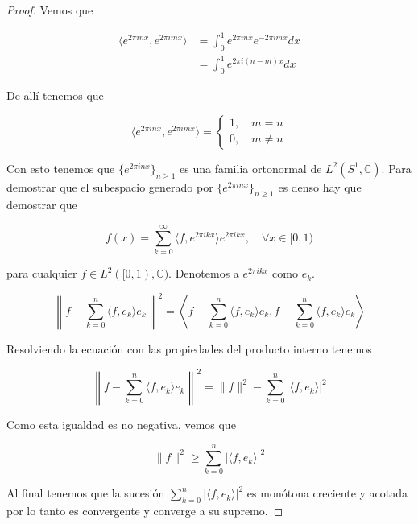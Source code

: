 \begin{proof}
	Vemos que
	
	\begin{align}
		\langle e^{2\pi inx},e^{2\pi imx} \rangle &= \int_{0}^{1} e^{2\pi inx} e^{-2\pi imx} dx\\
		&= \int_{0}^{1} e^{2\pi i(n-m)x} dx
	\end{align}
	
	De allí tenemos que
	
	\begin{equation}
		\langle e^{2\pi inx},e^{2\pi imx} \rangle = \begin{cases}
			1, \quad m=n\\			
			0,\quad m \neq n
		\end{cases}
	\end{equation}
	
	Con esto tenemos que $\{e^{2\pi inx}\}_{n \geq 1}$ es una familia ortonormal de $L^2(S^1,\mathbb{C})$. Para demostrar que el subespacio generado por $\{e^{2\pi inx}\}_{n \geq 1}$ es denso hay que demostrar que
	
	\begin{equation}
		f(x) = \sum_{k=0}^{\infty} \langle f,e^{2\pi ikx} \rangle e^{2\pi ikx}, \quad \forall x \in [0,1)
	\end{equation}
	
	para cualquier $f \in L^2([0,1),\mathbb{C})$. Denotemos a $e^{2\pi ikx}$ como $e_k$.
	
	\begin{equation}
		\left\| f - \sum_{k=0}^{n} \langle f,e_k \rangle e_k \right\|^2 = \left\langle f - \sum_{k=0}^{n} \langle f,e_k \rangle e_k, f - \sum_{k=0}^{n} \langle f,e_k \rangle e_k \right\rangle
	\end{equation}
	
	Resolviendo la ecuación con las propiedades del producto interno tenemos
	
	\begin{equation}
		\left\| f - \sum_{k=0}^{n} \langle f,e_k \rangle e_k \right\|^2 = \|f\|^2 - \sum_{k=0}^{n} |\langle f,e_k \rangle|^2
	\end{equation}
	
	Como esta igualdad es no negativa, vemos que
	
	\begin{equation}
		\|f\|^2 \geq \sum_{k=0}^{n} |\langle f,e_k \rangle|^2
	\end{equation}
	
	Al final tenemos que la sucesión $\sum_{k=0}^{n} |\langle f,e_k \rangle|^2$ es monótona creciente y acotada por lo tanto es convergente y converge a su supremo. 
\end{proof}